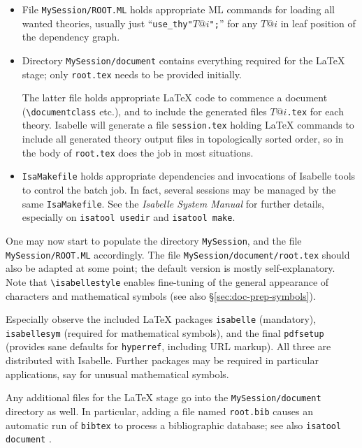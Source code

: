 \begin{isabellebody}
\begin{isamarkuptext}
\begin{itemize}
  \item File \texttt{MySession/ROOT.ML} holds appropriate ML commands
  for loading all wanted theories, usually just
  ``\texttt{use_thy"$T@i$";}'' for any $T@i$ in leaf position of the
  dependency graph.

  \item Directory \texttt{MySession/document} contains everything
  required for the {\LaTeX} stage; only \texttt{root.tex} needs to be
  provided initially.

  The latter file holds appropriate {\LaTeX} code to commence a
  document (\verb,\documentclass, etc.), and to include the generated
  files $T@i$\texttt{.tex} for each theory.  Isabelle will generate a
  file \texttt{session.tex} holding {\LaTeX} commands to include all
  generated theory output files in topologically sorted order, so
  \verb,, in the body of \texttt{root.tex} does the job
  in most situations.

  \item \texttt{IsaMakefile} holds appropriate dependencies and
  invocations of Isabelle tools to control the batch job.  In fact,
  several sessions may be managed by the same \texttt{IsaMakefile}.
  See the \emph{Isabelle System Manual} \cite{isabelle-sys} 
  for further details, especially on
  \texttt{isatool usedir} and \texttt{isatool make}.

  \end{itemize}

  One may now start to populate the directory \texttt{MySession}, and
  the file \texttt{MySession/ROOT.ML} accordingly.  The file
  \texttt{MySession/document/root.tex} should also be adapted at some
  point; the default version is mostly self-explanatory.  Note that
  \verb,\isabellestyle, enables fine-tuning of the general appearance
  of characters and mathematical symbols (see also
  \S\ref{sec:doc-prep-symbols}).

  Especially observe the included {\LaTeX} packages \texttt{isabelle}
  (mandatory), \texttt{isabellesym} (required for mathematical
  symbols), and the final \texttt{pdfsetup} (provides sane defaults
  for \texttt{hyperref}, including URL markup).  All three are
  distributed with Isabelle. Further packages may be required in
  particular applications, say for unusual mathematical symbols.

  \medskip Any additional files for the {\LaTeX} stage go into the
  \texttt{MySession/document} directory as well.  In particular,
  adding a file named \texttt{root.bib} causes an automatic run of
  \texttt{bibtex} to process a bibliographic database; see also
  \texttt{isatool document} \cite{isabelle-sys}.


\end{isamarkuptext}
\end{isabellebody}
